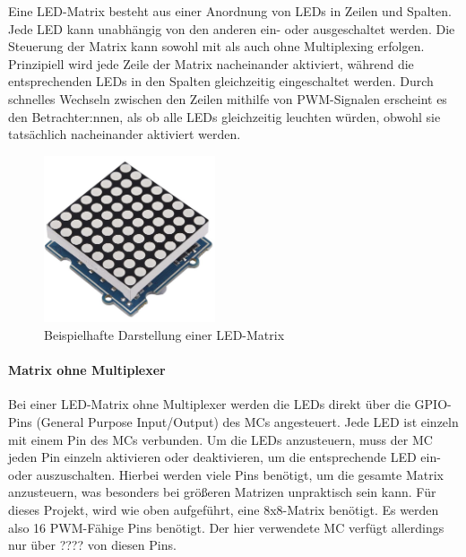 Eine LED-Matrix besteht aus einer Anordnung von LEDs in Zeilen und Spalten.
Jede LED kann unabhängig von den anderen ein- oder ausgeschaltet werden.
Die Steuerung der Matrix kann sowohl mit als auch ohne Multiplexing erfolgen.
Prinzipiell wird jede Zeile der Matrix nacheinander aktiviert, während die
entsprechenden LEDs in den Spalten gleichzeitig eingeschaltet werden.
Durch schnelles Wechseln zwischen den Zeilen mithilfe von \ac{PWM}-Signalen erscheint es den Betrachter:nnen, als ob alle LEDs
gleichzeitig leuchten würden, obwohl sie tatsächlich nacheinander aktiviert werden.

\begin{figure}[htbp]
	\centering
	\includegraphics[width=0.45\textwidth]{img/LED-Matrix}
	\caption{Beispielhafte Darstellung einer LED-Matrix}
	\label{img:LED-Matrix}
\end{figure}

\paragraph{Matrix ohne Multiplexer}

Bei einer LED-Matrix ohne Multiplexer werden die LEDs direkt über die GPIO-Pins (General Purpose Input/Output) des %
\ac{MC}s angesteuert. Jede LED ist einzeln mit einem Pin des \ac{MC}s verbunden. Um die LEDs anzusteuern,
muss der \ac{MC} jeden Pin einzeln aktivieren oder deaktivieren, um die entsprechende LED ein- oder auszuschalten.
Hierbei werden viele Pins benötigt, um die gesamte Matrix anzusteuern, was besonders bei größeren Matrizen unpraktisch
sein kann. Für dieses Projekt, wird wie oben aufgeführt, eine 8x8-Matrix benötigt. Es werden also 16 PWM-Fähige Pins
benötigt. Der hier verwendete \ac{MC} verfügt allerdings nur über ???? von diesen Pins.

